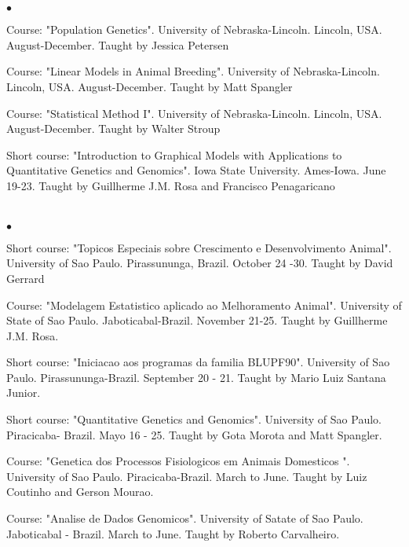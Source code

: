 \documentclass[margin,line,10pt]{res}
\newenvironment{list2}{
  \begin{list}{$\bullet$}{%
      \setlength{\itemsep}{0in}
      \setlength{\parsep}{0in} \setlength{\parskip}{0in}
      \setlength{\topsep}{0in} \setlength{\partopsep}{0in} 
      \setlength{\leftmargin}{0.2in}}}{\end{list}}
\begin{document}
\begin{resume}
\section{}
\begin{list2}
\item Course: "Population Genetics". University of Nebraska-Lincoln. Lincoln, USA. August-December. Taught by Jessica Petersen
\vspace{0.5cm}
\item Course: "Linear Models in Animal Breeding". University of Nebraska-Lincoln. Lincoln, USA. August-December. Taught by Matt Spangler
\vspace{0.5cm}
\item Course: "Statistical Method I". University of Nebraska-Lincoln. Lincoln, USA. August-December. Taught by Walter Stroup
\vspace{0.5cm}
\item Short course: "Introduction to Graphical Models with Applications to Quantitative Genetics and Genomics". Iowa State University. Ames-Iowa. June 19-23. Taught by Guillherme J.M. Rosa and Francisco Penagaricano
\vspace{0.5cm}
\end{list2}  

\section{}

\begin{list2}
  \item Short course: "Topicos Especiais sobre Crescimento e Desenvolvimento Animal". University of Sao Paulo. Pirassununga, Brazil. October 24 -30. Taught by David Gerrard
  \vspace{0.5cm}
  \item Course: "Modelagem Estatistico aplicado ao Melhoramento Animal". University of State of Sao Paulo. Jaboticabal-Brazil. November 21-25. Taught by Guillherme J.M. Rosa. 
  \vspace{0.5cm}
  \item Short course: "Iniciacao aos programas da familia BLUPF90". University of Sao Paulo. Pirassununga-Brazil. September 20 - 21. 
  Taught by Mario Luiz Santana Junior.
  \vspace{0.5cm}
  \item Short course: "Quantitative Genetics and Genomics". University of Sao Paulo. Piracicaba- Brazil. Mayo 16 - 25.
  Taught by Gota Morota and Matt Spangler.
  \vspace{0.5cm}
    \item Course: "Genetica dos Processos Fisiologicos em Animais Domesticos ". University of Sao Paulo. Piracicaba-Brazil. March to  June. Taught by Luiz Coutinho and Gerson Mourao.
  \vspace{0.5cm}
   \item Course: "Analise de Dados Genomicos". University of Satate of Sao Paulo. Jaboticabal - Brazil. March to June.
  Taught by Roberto Carvalheiro.
\end{list2}  
\vspace{0.5cm}


\end{resume}
\end{document}
